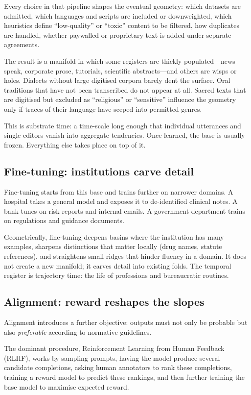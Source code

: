 Every choice in that pipeline shapes the eventual geometry: which datasets are admitted, which languages and scripts are included or downweighted, which heuristics define ``low-quality'' or ``toxic'' content to be filtered, how duplicates are handled, whether paywalled or proprietary text is added under separate agreements.

The result is a manifold in which some registers are thickly populated---news-speak, corporate prose, tutorials, scientific abstracts---and others are wisps or holes. Dialects without large digitised corpora barely dent the surface. Oral traditions that have not been transcribed do not appear at all. Sacred texts that are digitised but excluded as ``religious'' or ``sensitive'' influence the geometry only if traces of their language have seeped into permitted genres.

This is substrate time: a time-scale long enough that individual utterances and single editors vanish into aggregate tendencies. Once learned, the base is usually frozen. Everything else takes place on top of it.

\subsection{Fine-tuning: institutions carve detail}

Fine-tuning starts from this base and trains further on narrower domains. A hospital takes a general model and exposes it to de-identified clinical notes. A bank tunes on risk reports and internal emails. A government department trains on regulations and guidance documents.

Geometrically, fine-tuning deepens basins where the institution has many examples, sharpens distinctions that matter locally (drug names, statute references), and straightens small ridges that hinder fluency in a domain. It does not create a new manifold; it carves detail into existing folds. The temporal register is trajectory time: the life of professions and bureaucratic routines.

\subsection{Alignment: reward reshapes the slopes}

Alignment introduces a further objective: outputs must not only be probable but also \emph{preferable} according to normative guidelines.

The dominant procedure, Reinforcement Learning from Human Feedback (RLHF), works by sampling prompts, having the model produce several candidate completions, asking human annotators to rank these completions, training a reward model to predict these rankings, and then further training the base model to maximise expected reward.

